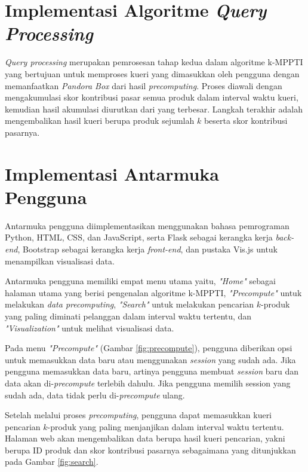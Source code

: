 \section{Implementasi Algoritme \textit{Query Processing}}
\tab \textit{Query processing} merupakan pemrosesan tahap kedua dalam algoritme k-MPPTI yang bertujuan untuk memproses kueri yang dimasukkan oleh pengguna dengan memanfaatkan \textit{Pandora Box} dari hasil \textit{precomputing}. Proses diawali dengan mengakumulasi skor kontribusi pasar semua produk dalam interval waktu kueri, kemudian hasil akumulasi diurutkan dari yang terbesar. Langkah terakhir adalah mengembalikan hasil kueri berupa produk sejumlah $k$ beserta skor kontribusi pasarnya.

\section{Implementasi Antarmuka Pengguna}
\tab Antarmuka pengguna diimplementasikan menggunakan bahasa pemrograman Python, HTML, CSS, dan JavaScript, serta Flask sebagai kerangka kerja \textit{back-end}, Bootstrap sebagai kerangka kerja \textit{front-end}, dan pustaka Vis.js untuk menampilkan visualisasi data. 

Antarmuka pengguna memiliki empat menu utama yaitu, \textit{"Home"} sebagai halaman utama yang berisi pengenalan algoritme k-MPPTI, \textit{"Precompute"} untuk melakukan \textit{data precomputing}, \textit{"Search"} untuk melakukan pencarian $k$-produk yang paling diminati pelanggan dalam interval waktu tertentu, dan \textit{"Visualization"} untuk melihat visualisasi data.

Pada menu \textit{"Precompute"} (Gambar \ref{fig:precompute}), pengguna diberikan opsi untuk memasukkan data baru atau menggunakan \textit{session} yang sudah ada. Jika pengguna memasukkan data baru, artinya pengguna membuat \textit{session} baru dan data akan di-\textit{precompute} terlebih dahulu. Jika pengguna memilih session yang sudah ada, data tidak perlu di-\textit{precompute} ulang.

Setelah melalui proses \textit{precomputing}, pengguna dapat memasukkan kueri pencarian $k$-produk yang paling menjanjikan dalam interval waktu tertentu. Halaman web akan mengembalikan data berupa hasil kueri pencarian, yakni berupa ID produk dan skor kontribusi pasarnya sebagaimana yang ditunjukkan pada Gambar \ref{fig:search}.

